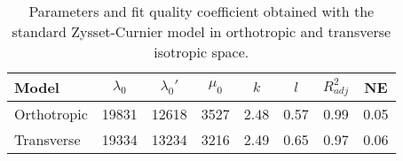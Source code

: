 \begin{table}[!h]
\centering
\caption{Parameters and fit quality coefficient obtained with the standard Zysset-Curnier model in orthotropic and transverse isotropic space.}
\label{TabZysset}
\begin{tabular}{l|c|c|c|c|c|c|c}
\toprule
      Model & $\lambda_0$ & $\lambda_0'$ & $\mu_0$ &  $k$ &  $l$ & $R^2_{adj}$ &   NE \\
\midrule
Orthotropic &       19831 &        12618 &    3527 & 2.48 & 0.57 &        0.99 & 0.05 \\
 Transverse &       19334 &        13234 &    3216 & 2.49 & 0.65 &        0.97 & 0.06 \\
\bottomrule
\end{tabular}
\end{table}
